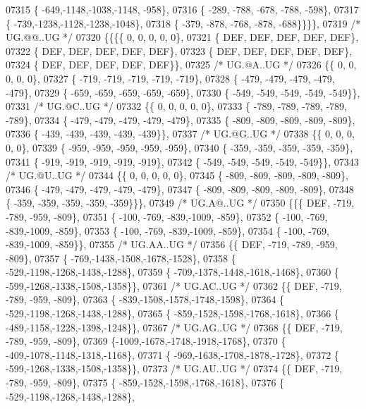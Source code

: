 \begin{DoxyCode}
07315 \{ -649,-1148,-1038,-1148, -958\},
07316 \{ -289, -788, -678, -788, -598\},
07317 \{ -739,-1238,-1128,-1238,-1048\},
07318 \{ -379, -878, -768, -878, -688\}\}\}\},
07319 \textcolor{comment}{/* UG.@@..UG */}
07320 \{\{\{\{    0,    0,    0,    0,    0\},
07321 \{  DEF,  DEF,  DEF,  DEF,  DEF\},
07322 \{  DEF,  DEF,  DEF,  DEF,  DEF\},
07323 \{  DEF,  DEF,  DEF,  DEF,  DEF\},
07324 \{  DEF,  DEF,  DEF,  DEF,  DEF\}\},
07325 \textcolor{comment}{/* UG.@A..UG */}
07326 \{\{    0,    0,    0,    0,    0\},
07327 \{ -719, -719, -719, -719, -719\},
07328 \{ -479, -479, -479, -479, -479\},
07329 \{ -659, -659, -659, -659, -659\},
07330 \{ -549, -549, -549, -549, -549\}\},
07331 \textcolor{comment}{/* UG.@C..UG */}
07332 \{\{    0,    0,    0,    0,    0\},
07333 \{ -789, -789, -789, -789, -789\},
07334 \{ -479, -479, -479, -479, -479\},
07335 \{ -809, -809, -809, -809, -809\},
07336 \{ -439, -439, -439, -439, -439\}\},
07337 \textcolor{comment}{/* UG.@G..UG */}
07338 \{\{    0,    0,    0,    0,    0\},
07339 \{ -959, -959, -959, -959, -959\},
07340 \{ -359, -359, -359, -359, -359\},
07341 \{ -919, -919, -919, -919, -919\},
07342 \{ -549, -549, -549, -549, -549\}\},
07343 \textcolor{comment}{/* UG.@U..UG */}
07344 \{\{    0,    0,    0,    0,    0\},
07345 \{ -809, -809, -809, -809, -809\},
07346 \{ -479, -479, -479, -479, -479\},
07347 \{ -809, -809, -809, -809, -809\},
07348 \{ -359, -359, -359, -359, -359\}\}\},
07349 \textcolor{comment}{/* UG.A@..UG */}
07350 \{\{\{  DEF, -719, -789, -959, -809\},
07351 \{ -100, -769, -839,-1009, -859\},
07352 \{ -100, -769, -839,-1009, -859\},
07353 \{ -100, -769, -839,-1009, -859\},
07354 \{ -100, -769, -839,-1009, -859\}\},
07355 \textcolor{comment}{/* UG.AA..UG */}
07356 \{\{  DEF, -719, -789, -959, -809\},
07357 \{ -769,-1438,-1508,-1678,-1528\},
07358 \{ -529,-1198,-1268,-1438,-1288\},
07359 \{ -709,-1378,-1448,-1618,-1468\},
07360 \{ -599,-1268,-1338,-1508,-1358\}\},
07361 \textcolor{comment}{/* UG.AC..UG */}
07362 \{\{  DEF, -719, -789, -959, -809\},
07363 \{ -839,-1508,-1578,-1748,-1598\},
07364 \{ -529,-1198,-1268,-1438,-1288\},
07365 \{ -859,-1528,-1598,-1768,-1618\},
07366 \{ -489,-1158,-1228,-1398,-1248\}\},
07367 \textcolor{comment}{/* UG.AG..UG */}
07368 \{\{  DEF, -719, -789, -959, -809\},
07369 \{-1009,-1678,-1748,-1918,-1768\},
07370 \{ -409,-1078,-1148,-1318,-1168\},
07371 \{ -969,-1638,-1708,-1878,-1728\},
07372 \{ -599,-1268,-1338,-1508,-1358\}\},
07373 \textcolor{comment}{/* UG.AU..UG */}
07374 \{\{  DEF, -719, -789, -959, -809\},
07375 \{ -859,-1528,-1598,-1768,-1618\},
07376 \{ -529,-1198,-1268,-1438,-1288\},

\end{DoxyCode}
